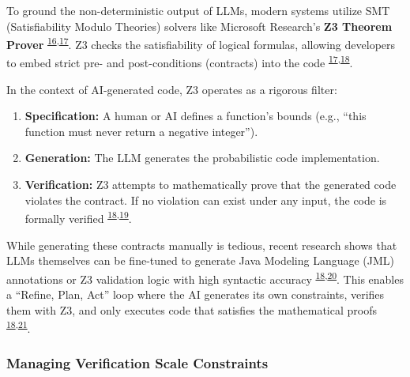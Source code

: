 \documentclass[
  11pt,
]{article}
\begin{document}
To ground the non-deterministic output of LLMs, modern systems utilize
SMT (Satisfiability Modulo Theories) solvers like Microsoft Research's
\textbf{Z3 Theorem Prover}
\textsuperscript{\protect\hyperlink{cite-16}{16},\protect\hyperlink{cite-17}{17}}.
Z3 checks the satisfiability of logical formulas, allowing developers to
embed strict pre- and post-conditions (contracts) into the code
\textsuperscript{\protect\hyperlink{cite-17}{17},\protect\hyperlink{cite-18}{18}}.

In the context of AI-generated code, Z3 operates as a rigorous filter:

\begin{enumerate}
\def\labelenumi{\arabic{enumi}.}
\item
  \hypertarget{cite-1}{}
  \textbf{Specification:} A human or AI defines a function's bounds
  (e.g., ``this function must never return a negative integer'').
\item
  \hypertarget{cite-2}{}
  \textbf{Generation:} The LLM generates the probabilistic code
  implementation.
\item
  \hypertarget{cite-3}{}
  \textbf{Verification:} Z3 attempts to mathematically prove that the
  generated code violates the contract. If no violation can exist under
  any input, the code is formally verified
  \textsuperscript{\protect\hyperlink{cite-18}{18},\protect\hyperlink{cite-19}{19}}.
\end{enumerate}

While generating these contracts manually is tedious, recent research
shows that LLMs themselves can be fine-tuned to generate Java Modeling
Language (JML) annotations or Z3 validation logic with high syntactic
accuracy
\textsuperscript{\protect\hyperlink{cite-18}{18},\protect\hyperlink{cite-20}{20}}.
This enables a ``Refine, Plan, Act'' loop where the AI generates its own
constraints, verifies them with Z3, and only executes code that
satisfies the mathematical proofs
\textsuperscript{\protect\hyperlink{cite-18}{18},\protect\hyperlink{cite-21}{21}}.

\hypertarget{managing-verification-scale-constraints}{%
\subsubsection{Managing Verification Scale
Constraints}\label{managing-verification-scale-constraints}}
\end{document}
